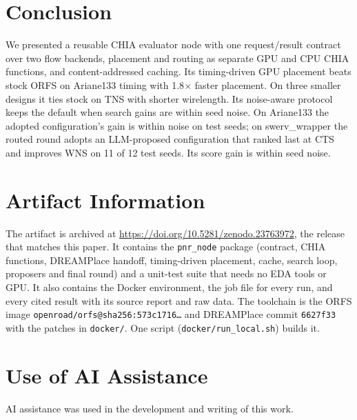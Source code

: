 \documentclass[sigconf]{acmart}
\begin{document}
\section{Conclusion}
\label{sec:conclusion}
We presented a reusable CHIA evaluator node with one request/result contract
over two flow backends, placement and routing as separate GPU and CPU CHIA
functions, and content-addressed caching. Its timing-driven GPU placement beats stock ORFS on Ariane133 timing
with 1.8$\times$ faster placement. On three smaller designs it ties stock on
TNS with shorter wirelength. Its noise-aware protocol keeps the default when
search gains are within seed noise. On Ariane133 the adopted
configuration's gain is within noise on test seeds; on swerv\_wrapper the
routed round adopts an LLM-proposed configuration that ranked last at CTS and
improves WNS on 11 of 12 test seeds. Its score gain is within seed noise.

\section{Artifact Information}
\label{sec:artifact}
The artifact is archived at
\url{https://doi.org/10.5281/zenodo.23763972}, the
release that matches this paper. It contains the \texttt{pnr\_node} package
(contract, CHIA functions, DREAMPlace handoff, timing-driven placement,
cache, search loop, proposers and final round) and a unit-test suite that
needs no EDA tools or GPU. It also contains the Docker environment, the job
file for every run, and every cited result with its source report and raw
data. The toolchain is the
ORFS image \texttt{openroad/orfs@sha256:573c1716\ldots} and DREAMPlace commit
\texttt{6627f33} with the patches in \texttt{docker/}. One script
(\texttt{docker/run\_local.sh}) builds it.

\section*{Use of AI Assistance}
AI assistance was used in the development and writing of this work.



\end{document}

